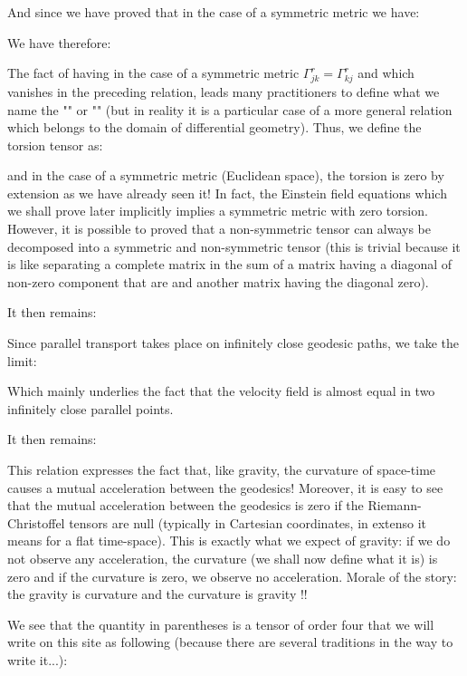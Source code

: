 	And since we have proved that in the case of a symmetric metric we have:
	
	We have therefore:
	
	\begin{tcolorbox}[title=Remark,colframe=black,arc=10pt]
	The fact of having in the case of a symmetric metric $\Gamma_{jk}^r=\Gamma_{kj}^r$ and which vanishes in the preceding relation, leads many practitioners to define what we name the "\label{torsion tensor}" or "" (but in reality it is a particular case of a more general relation which belongs to the domain of differential geometry). Thus, we define the torsion tensor as:
	
	and in the case of a symmetric metric (Euclidean space), the torsion is zero by extension as we have already seen it! In fact, the Einstein field equations which we shall prove later implicitly implies a symmetric metric with zero torsion. However, it is possible to proved that a non-symmetric tensor can always be decomposed into a symmetric and non-symmetric tensor (this is trivial because it is like separating a complete matrix in the sum of a matrix having a diagonal of non-zero component that are and another matrix having the diagonal zero).
	\end{tcolorbox}
	It then remains:
	
	Since parallel transport takes place on infinitely close geodesic paths, we take the limit:
	
	Which mainly underlies the fact that the velocity field is almost equal in two infinitely close parallel points.

	It then remains:
	
	This relation expresses the fact that, like gravity, the curvature of space-time causes a mutual acceleration between the geodesics! Moreover, it is easy to see that the mutual acceleration between the geodesics is zero if the Riemann-Christoffel tensors are null (typically in Cartesian coordinates, in extenso it means for a flat time-space). This is exactly what we expect of gravity: if we do not observe any acceleration, the curvature (we shall now define what it is) is zero and if the curvature is zero, we observe no acceleration. Morale of the story: the gravity is curvature and the curvature is gravity !!

	We see that the quantity in parentheses is a tensor of order four that we will write on this site as following (because there are several traditions in the way to write it...):
	

